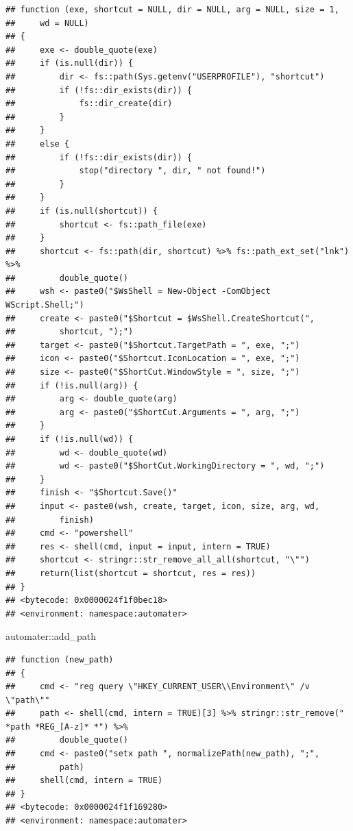 \documentclass[
]{article}
\newenvironment{Shaded}{\begin{snugshade}}{\end{snugshade}}
\newcommand{\NormalTok}[1]{#1}
\newcommand{\SpecialCharTok}[1]{\textcolor[rgb]{0.00,0.00,0.00}{#1}}
\begin{document}
\begin{verbatim}
## function (exe, shortcut = NULL, dir = NULL, arg = NULL, size = 1, 
##     wd = NULL) 
## {
##     exe <- double_quote(exe)
##     if (is.null(dir)) {
##         dir <- fs::path(Sys.getenv("USERPROFILE"), "shortcut")
##         if (!fs::dir_exists(dir)) {
##             fs::dir_create(dir)
##         }
##     }
##     else {
##         if (!fs::dir_exists(dir)) {
##             stop("directory ", dir, " not found!")
##         }
##     }
##     if (is.null(shortcut)) {
##         shortcut <- fs::path_file(exe)
##     }
##     shortcut <- fs::path(dir, shortcut) %>% fs::path_ext_set("lnk") %>% 
##         double_quote()
##     wsh <- paste0("$WsShell = New-Object -ComObject WScript.Shell;")
##     create <- paste0("$Shortcut = $WsShell.CreateShortcut(", 
##         shortcut, ");")
##     target <- paste0("$Shortcut.TargetPath = ", exe, ";")
##     icon <- paste0("$Shortcut.IconLocation = ", exe, ";")
##     size <- paste0("$ShortCut.WindowStyle = ", size, ";")
##     if (!is.null(arg)) {
##         arg <- double_quote(arg)
##         arg <- paste0("$ShortCut.Arguments = ", arg, ";")
##     }
##     if (!is.null(wd)) {
##         wd <- double_quote(wd)
##         wd <- paste0("$ShortCut.WorkingDirectory = ", wd, ";")
##     }
##     finish <- "$Shortcut.Save()"
##     input <- paste0(wsh, create, target, icon, size, arg, wd, 
##         finish)
##     cmd <- "powershell"
##     res <- shell(cmd, input = input, intern = TRUE)
##     shortcut <- stringr::str_remove_all_all(shortcut, "\"")
##     return(list(shortcut = shortcut, res = res))
## }
## <bytecode: 0x0000024f1f0bec18>
## <environment: namespace:automater>
\end{verbatim}

\begin{Shaded}
\begin{Highlighting}[]
\NormalTok{automater}\SpecialCharTok{::}\NormalTok{add\_path}
\end{Highlighting}
\end{Shaded}

\begin{verbatim}
## function (new_path) 
## {
##     cmd <- "reg query \"HKEY_CURRENT_USER\\Environment\" /v \"path\""
##     path <- shell(cmd, intern = TRUE)[3] %>% stringr::str_remove(" *path *REG_[A-z]* *") %>% 
##         double_quote()
##     cmd <- paste0("setx path ", normalizePath(new_path), ";", 
##         path)
##     shell(cmd, intern = TRUE)
## }
## <bytecode: 0x0000024f1f169280>
## <environment: namespace:automater>
\end{verbatim}
\end{document}
